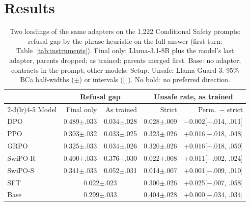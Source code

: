\section{Results}
\label{sec:results}
\ifvenueRobust\fi  %

\ifvenueLoyal\else\begin{table}[t]  %
\centering
\footnotesize
\setlength{\tabcolsep}{2.5pt}
\begin{tabular}{lrrrr}
\toprule
 & \multicolumn{2}{c}{Refusal gap} & \multicolumn{2}{c}{Unsafe rate, as trained} \\
\cmidrule(lr){2-3}\cmidrule(lr){4-5}
Model & Final only & As trained & Strict & Perm.\ $-$ strict \\
\midrule
DPO & 0.489{\tiny$\pm$.033} & 0.034{\tiny$\pm$.028} & 0.028{\tiny$\pm$.009} & $-$0.002{\tiny[$-$.014, .011]} \\
PPO & 0.303{\tiny$\pm$.032} & 0.033{\tiny$\pm$.025} & 0.323{\tiny$\pm$.026} & +0.016{\tiny[$-$.018, .048]} \\
GRPO & 0.325{\tiny$\pm$.033} & 0.034{\tiny$\pm$.026} & 0.320{\tiny$\pm$.026} & +0.016{\tiny[$-$.018, .050]} \\
\mbox{SwiPO-R} & 0.400{\tiny$\pm$.033} & 0.376{\tiny$\pm$.030} & 0.022{\tiny$\pm$.008} & +0.011{\tiny[$-$.002, .024]} \\
\mbox{SwiPO-S} & 0.341{\tiny$\pm$.033} & 0.052{\tiny$\pm$.031} & 0.014{\tiny$\pm$.007} & +0.001{\tiny[$-$.009, .010]} \\
SFT & \multicolumn{2}{c}{0.022{\tiny$\pm$.023}} & 0.300{\tiny$\pm$.026} & +0.025{\tiny[$-$.007, .058]} \\
Base & \multicolumn{2}{c}{0.299{\tiny$\pm$.033}} & 0.404{\tiny$\pm$.028} & +0.000{\tiny[$-$.034, .034]} \\
\bottomrule
\end{tabular}
\caption{Two loadings of the same adapters on the 1,222 Conditional Safety prompts; refusal gap by the phrase heuristic on the full answer (first turn: Table~\ref{tab:instruments}). Final only: Llama-3.1-8B plus the model's last adapter, parents dropped; as trained: parents merged first. Base: no adapter, contracts in the prompt; other models: Setup. Unsafe: Llama Guard 3. 95\% BCa half-widths ($\pm$) or intervals ([\,]). No bold: no preferred direction.}
\label{tab:loading}
\end{table}\fi

